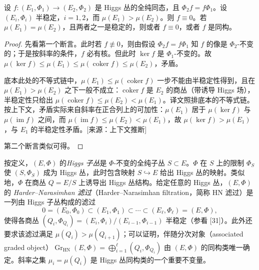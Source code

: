 \setcounter{theorem}{7}

\begin{lemma}\label{lem:4.2.8}
设 $f\colon(E_1,\Phi_1)\to(E_2,\Phi_2)$ 是 Higgs 丛的全纯同态，且 $\Phi_2f=f\Phi_1$。设 $(E_i,\Phi_i)$ 半稳定，$i=1,2$，而 $\mu(E_1)>\mu(E_2)$。则 $f\equiv0$。若 $\mu(E_1)=\mu(E_2)$，且两者之一是稳定的，则或者 $f\equiv0$，或者 $f$ 是同构。
\end{lemma}

\begin{proof}
先看第一个断言。此时若 $f\not\equiv0$，则由假设 $\Phi_2f=f\Phi_1$ 知 $f$ 的像是 $\Phi_2$-不变的；于是按斜率的条件，$f$ 必有核。但此时 $\ker f$ 是 $\Phi_1$-不变的。故 $\mu(\ker f)\le\mu(E_1)\le\mu(\operatorname{coker}f)\le\mu(E_2)$，矛盾。
\begin{annote}底本此处的不等式链中，$\mu(E_1)\le\mu(\operatorname{coker}f)$ 一步不能由半稳定性得到，且在 $\mu(E_1)>\mu(E_2)$ 之下一般不成立：$\operatorname{coker}f$ 是 $E_2$ 的商丛（带诱导 Higgs 场），半稳定性只给出 $\mu(\operatorname{coker}f)\le\mu(E_2)<\mu(E_1)$。译文照排底本的不等式链。按上下文，矛盾实际来自斜率在正合列上的可加性：$\mu(E_1)$ 居于 $\mu(\ker f)$ 与 $\mu(\operatorname{im}f)$ 之间，而 $\mu(\operatorname{im}f)\le\mu(E_2)<\mu(E_1)$，故 $\mu(\ker f)>\mu(E_1)$，与 $E_1$ 的半稳定性矛盾。[来源：上下文推断]\end{annote}
第二个断言类似可得。
\end{proof}

按定义，$(E,\Phi)$ 的\emph{Higgs 子丛}是 $\Phi$-不变的全纯子丛 $S\subset E$。$\Phi$ 在 $S$ 上的限制 $\Phi_S$ 使 $(S,\Phi_S)$ 成为 Higgs 丛，此时包含映射 $S\hookrightarrow E$ 给出 Higgs 丛的映射。类似地，$\Phi$ 在商丛 $Q=E/S$ 上诱导出 Higgs 丛结构。给定任意的 Higgs 丛，$(E,\Phi)$ 的 \emph{Harder--Narasimhan 滤过}（Harder--Narasimhan filtration，简称 HN 滤过）是一列由 Higgs 子丛构成的滤过
\[
0=(E_0,\Phi_0)\subset(E_1,\Phi_1)\subset\cdots\subset(E_\ell,\Phi_\ell)=(E,\Phi),
\]
使得各商丛 $(Q_i,\Phi_{Q_i})=(E_i,\Phi_i)/(E_{i-1},\Phi_{i-1})$ 半稳定（参看 [31]）。此外还要求该滤过满足 $\mu(Q_i)>\mu(Q_{i+1})$；可以证明，伴随分次对象（associated graded object）$\operatorname{Gr}_{\mathrm{HN}}(E,\Phi)=\bigoplus_{i=1}^{\ell}(Q_i,\Phi_{Q_i})$ 由 $(E,\Phi)$ 的同构类唯一确定。斜率之集 $\mu_i=\mu(Q_i)$ 是 Higgs 丛同构类的一个重要不变量。

